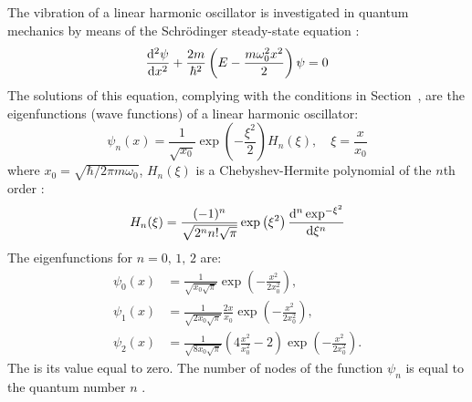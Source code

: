 \subsection{}\label{38.5.4} The vibration of a linear harmonic oscillator is investigated in quantum mechanics by means of the Schr\"odinger steady-state equation :
\begin{equation*}
\dv[2]{\psi}{x} + \frac{2m}{\hbar^{2}} \left( E - \frac{m \omega_{0}^{2} x^{2}}{2} \right) \psi = 0
\end{equation*}
The solutions of this equation, complying with the conditions
in Section~, are the eigenfunctions (wave functions) of a linear harmonic oscillator:
\begin{equation*}
\psi_{n}(x) = \frac{1}{\sqrt{x_{0}}} \exp\left( -\frac{\xi^{2}}{2} \right) H_{n}(\xi), \quad \xi = \frac{x}{x_{0}}
\end{equation*}
where $x_{0}= \sqrt{\hbar/ 2\pi m \omega_{0}}$, $H_{n}(\xi)$ is a Chebyshev-Hermite polynomial of the $n$th order :
\begin{equation*}%
H_{n}(\xi) = \frac{(-1)^{n}}{\sqrt{2^{n} n!\sqrt{\pi}}} \exp \left(\xi^{2} \right) \dv[n]{\exp^{-\xi^{2}}}{\xi}
\end{equation*}
The eigenfunctions for $n = 0, \,1,\, 2$ are:
\begin{align*}%
\psi_{0}(x) & = \frac{1}{\sqrt{x_{0}\sqrt{\pi}}} \exp \left( - \frac{x^{2}}{2x_{0}^{2}}\right), \\
\psi_{1}(x) & = \frac{1}{\sqrt{2x_{0}\sqrt{\pi}}} \frac{2x}{x_{0}} \exp \left( - \frac{x^{2}}{2x_{0}^{2}}\right), \\
\psi_{2}(x) & = \frac{1}{\sqrt{8x_{0}\sqrt{\pi}}} \left( 4 \frac{x^{2}}{x_{0}^{2}} - 2\right)\exp \left( - \frac{x^{2}}{2x_{0}^{2}}\right).
\end{align*}
The  is its value equal to zero. The number of nodes of the function $\psi_{n}$ is equal to the quantum number $n$ .



